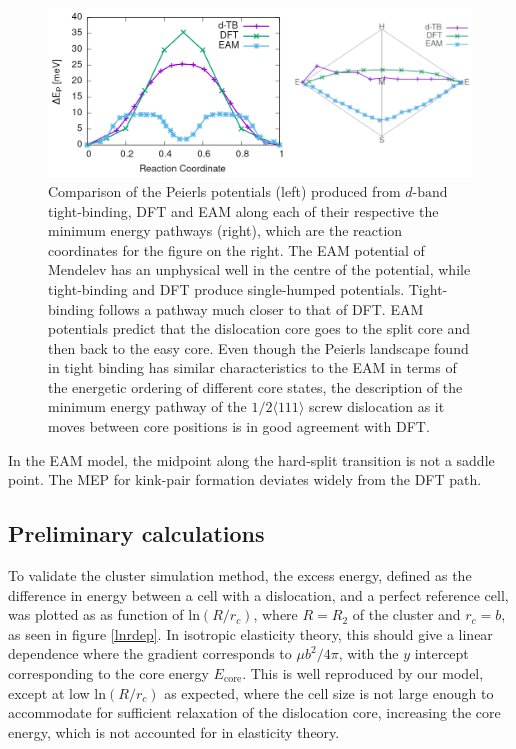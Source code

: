 \documentclass[a4paper,11pt]{article}
\begin{document}
\begin{figure}[htbp]

\includegraphics[width=\textwidth]{Images/easy-easy_transition_pathway_combined_dft_dTB_eam.png}
\caption{Comparison of the Peierls potentials (left) produced from \(d\text{-band}\) tight-binding, DFT and EAM along each of their respective the minimum energy pathways (right), which are the reaction coordinates for the figure on the right. The EAM potential of Mendelev \cite{Mendelev2003} has an unphysical well in the centre of the potential, while tight-binding and DFT produce single-humped potentials. Tight-binding follows a pathway much closer to that of DFT. EAM potentials predict that the dislocation core goes to the split core and then back to the easy core. Even though the Peierls landscape found in tight binding has similar characteristics to the EAM in terms of the energetic ordering of different core states, the description of the minimum energy pathway of the \(1/2\langle 111 \rangle\) screw dislocation as it moves between core positions is in good agreement with DFT. \label{easyeasytransition}}
\end{figure}


In the EAM model, the midpoint along the hard-split transition is not a saddle
point. The MEP for kink-pair formation deviates widely from the DFT path. 

\subsection{Preliminary calculations}
\label{sec:orgabfa42c}


To validate the cluster simulation method, the excess energy, defined as the difference in energy
between a cell with a dislocation, and a perfect reference cell, was plotted as as function of
\(\text{ln}(R/r_c)\), where \(R = R_2\) of the cluster and \(r_c = b\), as seen in
figure \ref{lnrdep}. In isotropic elasticity theory, this should give a linear dependence where the gradient
corresponds to \(\mu b^2 / 4\pi\), with the \(y\) intercept corresponding to the
core energy \(E_{\text{core}}\). This is well reproduced by our model, except at low \(\text{ln}(R/r_c)\)
as expected, where the cell size is not large enough to accommodate for sufficient relaxation of
the dislocation core, increasing the core energy, which is not accounted for in elasticity theory.
\end{document}
